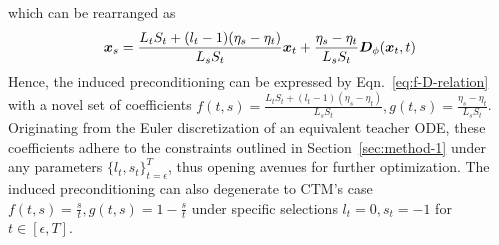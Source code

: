 which can be rearranged as
\begin{equation}
\label{eq:generalize-discretization-rearranged}
    \bm{x}_s=\frac{L_tS_t+(l_t-1)(\eta_s-\eta_t)}{L_sS_t}\bm{x}_t+\frac{\eta_s-\eta_t}{L_sS_t}\bm{D}_\phi(\bm{x}_t,t)
\end{equation}
Hence, the induced preconditioning can be expressed by Eqn.~\eqref{eq:f-D-relation} with a novel set of coefficients $f(t,s)=\frac{L_tS_t+(l_t-1)(\eta_s-\eta_t)}{L_sS_t}, g(t,s)=\frac{\eta_s-\eta_t}{L_sS_t}$. Originating from the Euler discretization of an equivalent teacher ODE, these coefficients adhere to the constraints outlined in Section~\ref{sec:method-1} under any parameters $\{l_t,s_t\}_{t=\epsilon}^T$, thus opening avenues for further optimization. The induced preconditioning can also degenerate to CTM's case $f(t,s)=\frac{s}{t},g(t,s)=1-\frac{s}{t}$ under specific selections $l_t=0,s_t=-1$ for $t\in[\epsilon,T]$.
